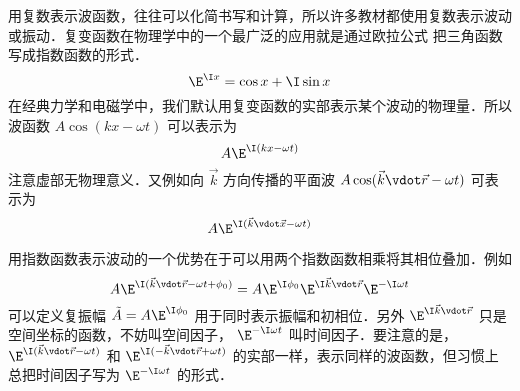 

用复数表示波函数，往往可以化简书写和计算，所以许多教材都使用复数表示波动或振动．复变函数在物理学中的一个最广泛的应用就是通过欧拉公式%
把三角函数写成指数函数的形式．
\begin{equation}%
\E^{\I x} = \cos x + \I\sin x 
\end{equation} 
在经典力学和电磁学中，我们默认用复变函数的实部表示某个波动的物理量．所以波函数 $A\cos (kx - \omega t)$ 可以表示为
\begin{equation}
A \E^{\I( kx - \omega t )}
\end{equation}
注意虚部无物理意义．又例如向 $\vec k$ 方向传播的平面波 $A\cos( \vec k\vdot\vec r - \omega t )$ 可表示为
\begin{equation}
A \E^{\I( \vec k \vdot \vec x - \omega t )}
\end{equation}

用指数函数表示波动的一个优势在于可以用两个指数函数相乘将其相位叠加．例如
\begin{equation}
A \E^{\I( \vec k \vdot \vec r - \omega t + \phi_0 )} = A \E^{\I \phi_0} \E^{\I\vec k \vdot \vec r} \E^{ - \I\omega t}
\end{equation}
可以定义复振幅 $\tilde A = A \E^{\I \phi_0}$ 用于同时表示振幅和初相位．另外 $\E^{\I\vec k \vdot \vec r}$ 只是空间坐标的函数，不妨叫空间因子， $\E^{ - \I\omega t}$ 叫时间因子．要注意的是， $\E^{\I( \vec k \vdot \vec r - \omega t )}$ 和 $\E^{\I(  - \vec k \vdot \vec r + \omega t )}$ 的实部一样，表示同样的波函数，但习惯上总把时间因子写为 $\E^{ - \I\omega t}$ 的形式．












